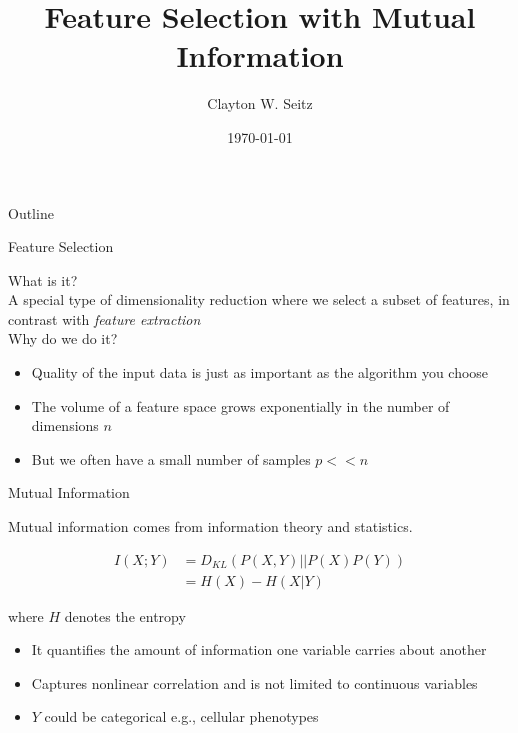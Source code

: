 \documentclass{beamer}					%
\title{Feature Selection with Mutual Information}	%
\author{Clayton W. Seitz}								%
\date{\today}									%
\begin{document}
\begin{frame}
  \titlepage
\end{frame}

\begin{frame}{Outline}
  \tableofcontents
\end{frame}

%

\begin{frame}{Feature Selection}

What is it?\\
\vspace{0.2in}
A special type of dimensionality reduction where we select a subset of features, in contrast with \emph{feature extraction}\\
\vspace{0.2in}
Why do we do it? \\
\vspace{0.2in}
\begin{itemize}
\item Quality of the input data is just as important as the algorithm you choose
\item The volume of a feature space grows exponentially in the number of dimensions $n$
\item But we often have a small number of samples $p<<n$
\end{itemize}

\end{frame}


\begin{frame}{Mutual Information}

Mutual information comes from information theory and statistics.

\begin{align*}
I(X;Y) &= D_{KL}(P(X,Y)||P(X)P(Y))\\
&= H(X) - H(X|Y)
\end{align*}

where $H$ denotes the entropy\\
\vspace{0.1in}

\begin{itemize}
\item It quantifies the amount of information one variable carries about another
\item Captures nonlinear correlation and is not limited to continuous variables
\item $Y$ could be categorical e.g., cellular phenotypes
\end{itemize}

\end{frame}
\end{document}
